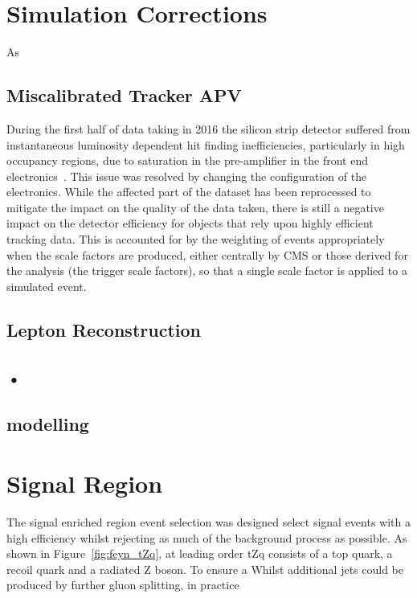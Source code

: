 \section{Simulation Corrections}\label{sec:simCorrections}
As 

\subsection{Miscalibrated Tracker APV}
During the first half of data taking in 2016 the silicon strip detector suffered from instantaneous luminosity dependent  hit finding inefficiencies, particularly in high occupancy regions, due to saturation in the pre-amplifier in the front end electronics~\cite{Fiori:2016ebh}.
This issue was resolved by changing the configuration of the electronics.
While the affected part of the dataset has been reprocessed to mitigate the impact on the quality of the data taken, there is still a negative impact on the detector efficiency for objects that rely upon highly efficient tracking data.
This is accounted for by the weighting of events appropriately when the scale factors are produced, either centrally by CMS or those derived for the analysis (\ie the trigger scale factors), so that a single scale factor is applied to a simulated event.


\subsection{Lepton Reconstruction}\label{subsec:leptonRecoSFs}
\subsection{•}
\subsection{\PU modelling}

\section{Signal Region}\label{sec:signalRegion}
The signal enriched region event selection was designed select signal events with a high efficiency whilst rejecting as much of the background process as possible.
As shown in Figure~\ref{fig:feyn_tZq}, at leading order tZq consists of a top quark, a recoil quark and a radiated Z boson.
To ensure a 
Whilst additional jets could be produced by further gluon splitting, in practice 

